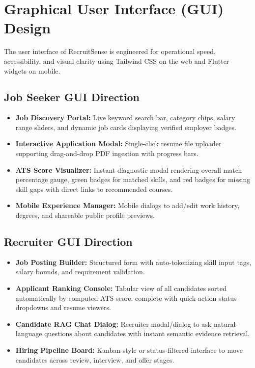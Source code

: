 \section{Graphical User Interface (GUI) Design}
The user interface of RecruitSense is engineered for operational speed, accessibility, and visual clarity using Tailwind CSS on the web and Flutter widgets on mobile.

\subsection{Job Seeker GUI Direction}
\begin{itemize}
    \item \textbf{Job Discovery Portal:} Live keyword search bar, category chips, salary range sliders, and dynamic job cards displaying verified employer badges.
    \item \textbf{Interactive Application Modal:} Single-click resume file uploader supporting drag-and-drop PDF ingestion with progress bars.
    \item \textbf{ATS Score Visualizer:} Instant diagnostic modal rendering overall match percentage gauge, green badges for matched skills, and red badges for missing skill gaps with direct links to recommended courses.
    \item \textbf{Mobile Experience Manager:} Mobile dialogs to add/edit work history, degrees, and shareable public profile previews.
\end{itemize}

\subsection{Recruiter GUI Direction}
\begin{itemize}
    \item \textbf{Job Posting Builder:} Structured form with auto-tokenizing skill input tags, salary bounds, and requirement validation.
    \item \textbf{Applicant Ranking Console:} Tabular view of all candidates sorted automatically by computed ATS score, complete with quick-action status dropdowns and resume viewers.
    \item \textbf{Candidate RAG Chat Dialog:} Recruiter modal/dialog to ask natural-language questions about candidates with instant semantic evidence retrieval.
    \item \textbf{Hiring Pipeline Board:} Kanban-style or status-filtered interface to move candidates across review, interview, and offer stages.
\end{itemize}

